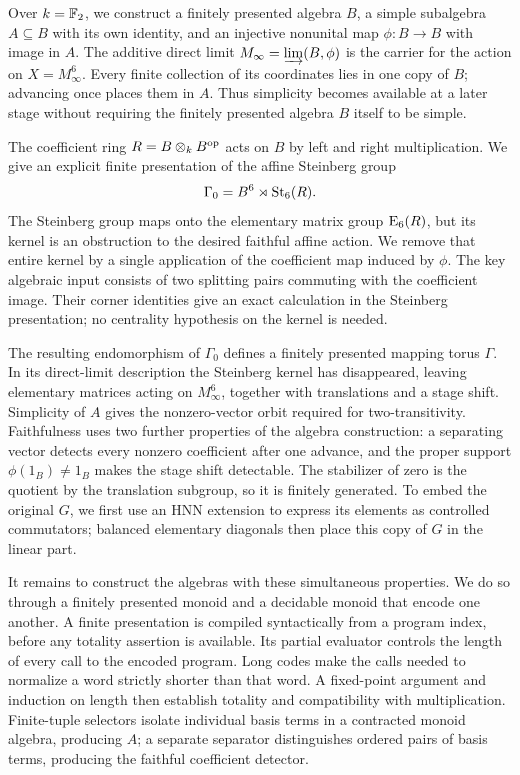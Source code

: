 Over \(k=\mathbb F_2\), we construct a finitely presented algebra \(B\), a
simple subalgebra \(A\subseteq B\) with its own identity, and an
injective nonunital map \(\phi:B\to B\) with image in \(A\).
The additive direct limit \(M_\infty=\varinjlim(B,\phi)\) is the
carrier for the action on \(X=M_\infty^6\). Every finite collection
of its coordinates lies in one copy of \(B\); advancing once places
them in \(A\). Thus simplicity becomes available at a later stage
without requiring the finitely presented algebra \(B\) itself to be
simple.

The coefficient ring \(R=B\otimes_k B^{\mathrm{op}}\) acts on \(B\) by
left and right multiplication. We give an explicit finite presentation
of the affine Steinberg group
\[
 \Gamma_0=B^6\rtimes\operatorname{St}_6(R).
\]
The Steinberg group maps onto the elementary matrix group \(\operatorname{E}_6(R)\),
but its kernel is an obstruction to the desired faithful affine action.
We remove that entire kernel by a single application of the coefficient
map induced by \(\phi\). The key algebraic input consists of two
splitting pairs commuting with the coefficient image. Their corner
identities give an exact calculation in the Steinberg presentation;
no centrality hypothesis on the kernel is needed.

The resulting endomorphism of \(\Gamma_0\) defines a finitely
presented mapping torus \(\Gamma\). In its direct-limit description
the Steinberg kernel has disappeared, leaving elementary matrices acting
on \(M_\infty^6\), together with translations and a stage shift.
Simplicity of \(A\) gives the nonzero-vector orbit required for
two-transitivity. Faithfulness uses two further properties of the
algebra construction: a separating vector detects every nonzero
coefficient after one advance, and the proper support
\(\phi(1_B)\ne1_B\) makes the stage shift detectable. The stabilizer
of zero is the quotient by the translation subgroup, so it is finitely
generated. To embed the original \(G\), we first use an HNN extension
to express its elements as controlled commutators; balanced elementary
diagonals then place this copy of \(G\) in the linear part.

It remains to construct the algebras with these simultaneous properties.
We do so through a finitely presented monoid and a decidable monoid that
encode one another. A finite presentation is compiled syntactically from
a program index, before any totality assertion is available. Its partial
evaluator controls the length of every call to the encoded program.
Long codes make the calls needed to normalize a word strictly shorter
than that word. A fixed-point argument and induction on length then
establish totality and compatibility with multiplication.
Finite-tuple selectors isolate individual basis terms in a contracted
monoid algebra, producing \(A\); a separate separator distinguishes
ordered pairs of basis terms, producing the faithful coefficient detector.

